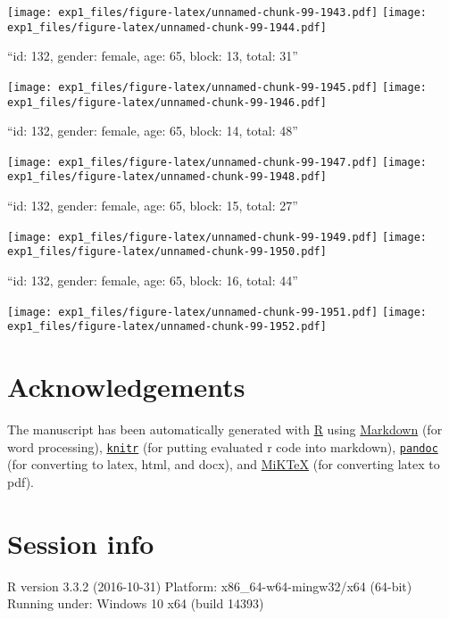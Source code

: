 \documentclass[,]{article}
\begin{document}
\texttt{[image: exp1\_files/figure-latex/unnamed-chunk-99-1943.pdf]}
\texttt{[image: exp1\_files/figure-latex/unnamed-chunk-99-1944.pdf]}

\newpage
[1] 

``id: 132, gender: female, age: 65, block: 13, total: 31''

\texttt{[image: exp1\_files/figure-latex/unnamed-chunk-99-1945.pdf]}
\texttt{[image: exp1\_files/figure-latex/unnamed-chunk-99-1946.pdf]}

\newpage
[1] 

``id: 132, gender: female, age: 65, block: 14, total: 48''

\texttt{[image: exp1\_files/figure-latex/unnamed-chunk-99-1947.pdf]}
\texttt{[image: exp1\_files/figure-latex/unnamed-chunk-99-1948.pdf]}

\newpage
[1] 

``id: 132, gender: female, age: 65, block: 15, total: 27''

\texttt{[image: exp1\_files/figure-latex/unnamed-chunk-99-1949.pdf]}
\texttt{[image: exp1\_files/figure-latex/unnamed-chunk-99-1950.pdf]}

\newpage
[1] 

``id: 132, gender: female, age: 65, block: 16, total: 44''

\texttt{[image: exp1\_files/figure-latex/unnamed-chunk-99-1951.pdf]}
\texttt{[image: exp1\_files/figure-latex/unnamed-chunk-99-1952.pdf]}

\newpage

\section{Acknowledgements}\label{acknowledgements}

The manuscript has been automatically generated with
\href{http://r-project.org/}{R} using
\href{http://daringfireball.net/projects/markdown/}{Markdown} (for word
processing), \href{http://yihui.name/knitr/}{\texttt{knitr}} (for
putting evaluated r code into markdown),
\href{http://johnmacfarlane.net/pandoc/}{\texttt{pandoc}} (for
converting to latex, html, and docx), and
\href{http://miktex.org/}{MiKTeX} (for converting latex to pdf).

\newpage

\section{Session info}\label{session-info}

R version 3.3.2 (2016-10-31) Platform: x86\_64-w64-mingw32/x64 (64-bit)
Running under: Windows 10 x64 (build 14393)
\end{document}
